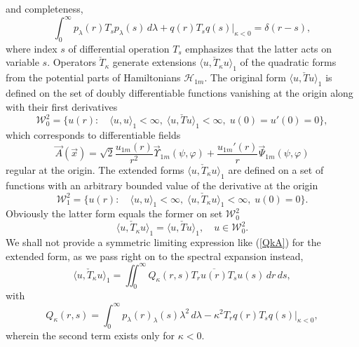 \documentclass[12pt]{article}
\newcommand{\ol}{\overline}
\newcommand{\HH}{\mathscr{H}}
\newcommand{\WW}{\mathscr{W}}
\begin{document}
	and completeness,
\begin{equation*}
    \int_{0}^{\infty} p_{\lambda}(r) T_{s} p_{\lambda}(s) \,d\lambda
        + q(r) T_{s} q(s)\bigr|_{\kappa < 0} = \delta(r-s) ,
\end{equation*}
	where index
$ s $
	of differential operation
$ T_{s} $
	emphasizes that the latter acts on variable
$ s $.
	Operators
$ \check{T}_{\kappa} $
	generate extensions
$ \langle u, \check{T}_{\kappa} u\rangle_{1} $
	of the quadratic forms from the potential parts of Hamiltonians
$ \HH_{1m} $.
	The original form
$ \langle u, \check{T} u\rangle_{1} $
	is defined on the set of doubly differentiable functions
	vanishing at the origin along with their first derivatives
\begin{equation*}
    \WW^{2}_{0} = \{u(r):\quad \langle u,u\rangle_{1} <\infty, \;
	\langle u, \check{T}u\rangle_{1} < \infty, \; u(0)=u'(0) =0 \} ,
\end{equation*}
	which corresponds to differentiable fields
\begin{equation}
\label{Atrns}
    \vec{A}(\vec{x}) =
        \sqrt{2}
	    \frac{u_{1m}(r)}{r^{2}} \vec{\Upsilon}_{1m}(\psi,\varphi) +
        \frac{u_{1m}'(r)}{r} \vec{\Psi}_{1m}(\psi,\varphi)
\end{equation}
	regular at the origin.
	The extended forms
$ \langle u, \check{T}_{\kappa} u\rangle_{1} $
	are defined on a set of functions with an arbitrary bounded value
	of the derivative at the origin
\begin{equation*}
    \WW^{2}_{1} = \{u(r):\quad \langle u,u\rangle_{1} <\infty, \;
	\langle u, \check{T}_{\kappa}u\rangle_{1} < \infty, \; u(0)=0 \} .
\end{equation*}
	Obviously the latter form equals the former on set
$ \WW^{2}_{0} $
\begin{equation*}
    \langle u, \check{T}_{\kappa} u\rangle_{1}= \langle u,
	\check{T} u\rangle_{1} ,\quad u \in \WW^{2}_{0} .
\end{equation*}
	We shall not provide a symmetric limiting expression like
(\ref{QkA})
    for the extended
	form, as we pass right on to the spectral expansion instead,
\begin{equation*}
    \langle u, \check{T}_{\kappa} u\rangle_{1}
    = \iint_{0}^{\infty} Q_{\kappa}(r,s) T_{r}\ol{u(r)} T_{s}u(s) \,dr\,ds ,
\end{equation*}
	with
\begin{equation*}
    Q_{\kappa}(r,s) = \int_{0}^{\infty} p_{\lambda}(r)
    	_{\lambda}(s) \lambda^{2} \,d\lambda
        - \kappa^{2} T_{r} q(r) T_{s} q(s) \bigr|_{\kappa <0} ,
\end{equation*}
	wherein the second term exists only for
$ \kappa < 0 $.
\end{document}
